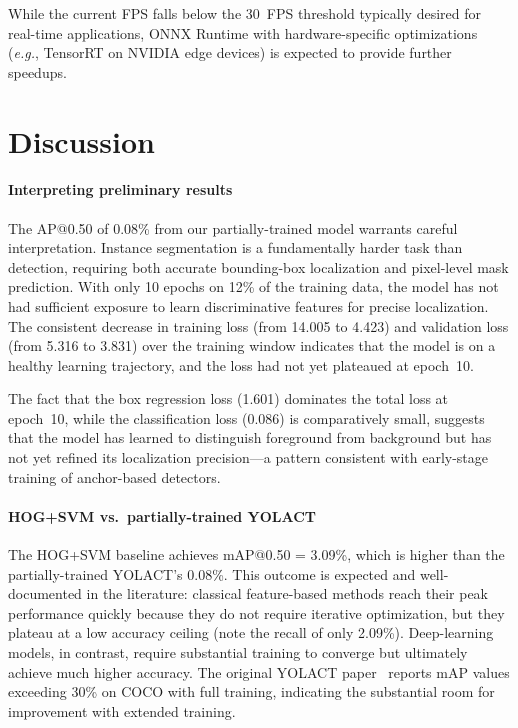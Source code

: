 \documentclass[conference]{IEEEtran}
\newcommand{\eg}{\emph{e.g.}}
\begin{document}
While the current FPS falls below the 30~FPS threshold typically desired
for real-time applications, ONNX Runtime with hardware-specific
optimizations (\eg, TensorRT on NVIDIA edge devices) is expected to
provide further speedups.

\section{Discussion}
\label{sec:discussion}

\paragraph{Interpreting preliminary results}
The AP@0.50 of 0.08\% from our partially-trained model warrants careful
interpretation. Instance segmentation is a fundamentally harder task
than detection, requiring both accurate bounding-box localization
and pixel-level mask prediction. With only 10 epochs on 12\% of the
training data, the model has not had sufficient exposure to learn
discriminative features for precise localization. The consistent
decrease in training loss (from 14.005 to 4.423) and validation loss
(from 5.316 to 3.831) over the training window indicates that the model
is on a healthy learning trajectory, and the loss had not yet plateaued
at epoch~10.

The fact that the box regression loss (1.601) dominates the total loss
at epoch~10, while the classification loss (0.086) is comparatively
small, suggests that the model has learned to distinguish foreground
from background but has not yet refined its localization precision---a
pattern consistent with early-stage training of anchor-based detectors.

\paragraph{HOG+SVM vs.\ partially-trained YOLACT}
The HOG+SVM baseline achieves mAP@0.50 = 3.09\%, which is higher than
the partially-trained YOLACT's 0.08\%. This outcome is expected and
well-documented in the literature: classical feature-based methods reach
their peak performance quickly because they do not require iterative
optimization, but they plateau at a low accuracy ceiling (note the
recall of only 2.09\%). Deep-learning models, in contrast, require
substantial training to converge but ultimately achieve much higher
accuracy. The original YOLACT paper~\cite{bolya2019yolact} reports
mAP values exceeding 30\% on COCO with full training, indicating
the substantial room for improvement with extended training.
\end{document}
